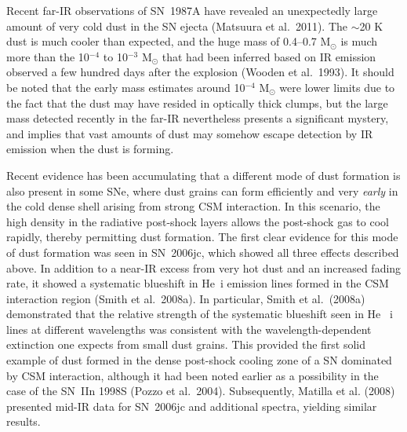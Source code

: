 \documentclass{emulateapj}
\begin{document}

Recent far-IR observations of SN~1987A have revealed an unexpectedly
large amount of very cold dust in the SN ejecta (Matsuura et al.\
2011).  The $\sim$20 K dust is much cooler than expected, and the huge
mass of 0.4--0.7 M$_{\odot}$ is much more than the 10$^{-4}$ to
10$^{-3}$ M$_{\odot}$ that had been inferred based on IR emission
observed a few hundred days after the explosion (Wooden et al.\ 1993).
It should be noted that the early mass estimates around 10$^{-4}$
M$_{\odot}$ were lower limits due to the fact that the dust may have
resided in optically thick clumps, but the large mass detected
recently in the far-IR nevertheless presents a significant mystery,
and implies that vast amounts of dust may somehow escape detection by
IR emission when the dust is forming.


Recent evidence has been accumulating that a different mode of dust
formation is also present in some SNe, where dust grains can form
efficiently and very {\it early} in the cold dense shell arising from
strong CSM interaction.  In this scenario, the high density in the
radiative post-shock layers allows the post-shock gas to cool rapidly,
thereby permitting dust formation.  The first clear evidence for this
mode of dust formation was seen in SN~2006jc, which showed all three
effects described above.  In addition to a near-IR excess from very hot
dust and an increased fading rate, it showed a systematic blueshift in
He~{\sc i} emission lines formed in the CSM interaction region (Smith
et al.\ 2008a).  In particular, Smith et al.\ (2008a) demonstrated
that the relative strength of the systematic blueshift seen in He~{\sc
  i} lines at different wavelengths was consistent with the
wavelength-dependent extinction one expects from small dust grains.
This provided the first solid example of dust formed in the dense
post-shock cooling zone of a SN dominated by CSM interaction, although
it had been noted earlier as a possibility in the case of the SN~IIn
1998S (Pozzo et al.\ 2004).  Subsequently, Matilla et al. (2008)
presented mid-IR data for SN~2006jc and additional spectra, yielding
similar results.
\end{document}
